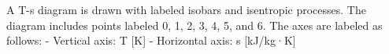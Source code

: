 A T-s diagram is drawn with labeled isobars and isentropic processes. The diagram includes points labeled 0, 1, 2, 3, 4, 5, and 6. The axes are labeled as follows:  
- Vertical axis: T [K]  
- Horizontal axis: s [kJ/kg·K]
